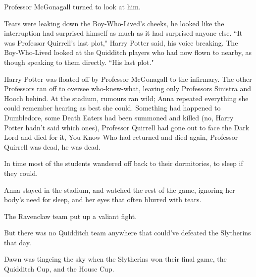 Professor McGonagall turned to look at him.

Tears were leaking down the Boy-Who-Lived's cheeks, he looked like the interruption had surprised himself as much as it had surprised anyone else. ``It was Professor Quirrell's last plot," Harry Potter said, his voice breaking. The Boy-Who-Lived looked at the Quidditch players who had now flown to nearby, as though speaking to them directly. ``His last plot."

Harry Potter was floated off by Professor McGonagall to the infirmary. The other Professors ran off to oversee who-knew-what, leaving only Professors Sinistra and Hooch behind. At the stadium, rumours ran wild; Anna repeated everything she could remember hearing as best she could. Something had happened to Dumbledore, some Death Eaters had been summoned and killed (no, Harry Potter hadn't said which ones), Professor Quirrell had gone out to face the Dark Lord and died for it, You-Know-Who had returned and died again, Professor Quirrell was dead, he was dead.

In time most of the students wandered off back to their dormitories, to sleep if they could.

Anna stayed in the stadium, and watched the rest of the game, ignoring her body's need for sleep, and her eyes that often blurred with tears.

The Ravenclaw team put up a valiant fight.

But there was no Quidditch team anywhere that could've defeated the Slytherins that day.

Dawn was tingeing the sky when the Slytherins won their final game, the Quidditch Cup, and the House Cup.

